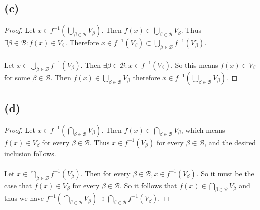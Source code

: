 \documentclass{article}
\theoremstyle{definition}
\begin{document}
    \subsection*{(c)}
        \begin{proof}
            \fbox{$\subset$}
            Let $x \in f^{-1}(\bigcup_{\beta \in \mathcal{B}} V_\beta)$.
            Then $f(x) \in \bigcup_{\beta \in \mathcal{B}} V_\beta$. Thus
            $\exists \beta \in \mathcal{B} : f(x) \in V_\beta$. Therefore $x \in f^{-1}(V_\beta) \subset \bigcup_{\beta \in \mathcal{B}}f^{-1}(V_\beta)$.
            \\\\
            \fbox{$\supset$}
            Let $x \in \bigcup_{\beta \in \mathcal{B}} f^{-1}(V_\beta)$.
            Then $\exists \beta \in \mathcal{B} : x \in f^{-1}(V_\beta)$.
            So this means $f(x) \in V_\beta$ for some $\beta \in \mathcal{B}$.
            Then $f(x) \in \bigcup_{\beta \in \mathcal{B}} V_\beta$ therefore $x \in f^{-1}(\bigcup_{\beta \in \mathcal{B}} V_\beta)$.
        \end{proof}
    \subsection*{(d)}
        \begin{proof}
            \fbox{$\subset$}
            Let $x \in f^{-1}(\bigcap_{\beta \in \mathcal{B}} V_\beta)$. Then $f(x) \in \bigcap_{\beta \in \mathcal{B}} V_\beta$, which means 
            $f(x) \in V_\beta$ for every $\beta \in \mathcal{B}$. Thus $x \in f^{-1}(V_\beta)$ for every $\beta \in \mathcal{B}$, and the desired inclusion follows.
            \\\\
            \fbox{$\supset$}
            Let $x \in  \bigcap_{\beta \in \mathcal{B}} f^{-1}(V_\beta)$. Then for every $\beta \in \mathcal{B}, x \in f^{-1}(V_\beta)$.
            So it must be the case that $f(x) \in V_\beta$ for every $\beta \in \mathcal{B}$. So it follows that $f(x) \in \bigcap_{\beta \in \mathcal{B}} V_\beta$ and
            thus we have $f^{-1}(\bigcap_{\beta \in \mathcal{B}} V_\beta) \supset \bigcap_{\beta \in \mathcal{B}} f^{-1}(V_\beta)$.
        \end{proof}
\end{document}

